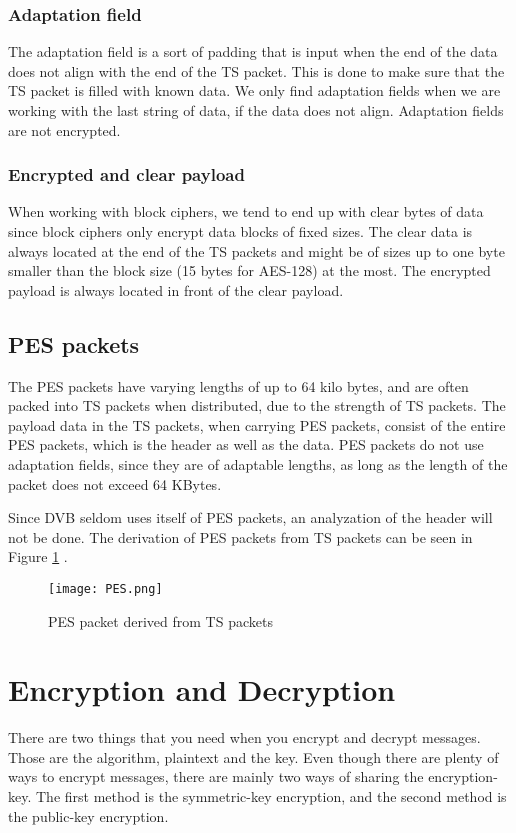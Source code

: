\subsubsection{Adaptation field}
The adaptation field is a sort of padding that is input when the end of 
the data does not align with the end of the TS packet. This is done to 
make sure that the TS packet is filled with known data. We only find 
adaptation fields when we are working with the last string of data, if 
the data does not align. Adaptation fields are not encrypted.
\cite[pp. 10--11]{DVB:2013}

\subsubsection{Encrypted and clear payload}
When working with block ciphers, we tend to end up with clear bytes of 
data since block ciphers only encrypt data blocks of fixed sizes. The 
clear data is always located at the end of the TS packets and might be 
of sizes up to one byte smaller than the block size (15 bytes for 
AES-128) at the most. The encrypted payload is always located in front 
of the clear payload. \cite[pp. 10--11]{DVB:2013}

\subsection{PES packets}
The PES packets have varying lengths of up to 64 kilo bytes, and are 
often packed into TS packets when distributed, due to the strength of 
TS packets. The payload data in the TS packets, when carrying PES 
packets, consist of the entire PES packets, which is the header as well 
as the data. PES packets do not use adaptation fields, since they are 
of adaptable lengths, as long as the length of the packet does not 
exceed 64 KBytes.

Since DVB seldom uses itself of PES packets, an analyzation of the 
header will not be done. The derivation of PES packets from TS packets 
can be seen in Figure \ref{img:PES} \citep[p. 9]{ETR:289}.

\begin{figure}
  \texttt{[image: PES.png]}
  \caption{PES packet derived from TS packets}
  \label{img:PES}
\end{figure}

\section{Encryption and Decryption}
There are two things that you need when you encrypt and decrypt 
messages. Those are the algorithm, plaintext and the key. Even though 
there are plenty of ways to encrypt messages, there are mainly two ways 
of sharing the encryption-key. The first method is the symmetric-key 
encryption, and the second method is the public-key encryption.

